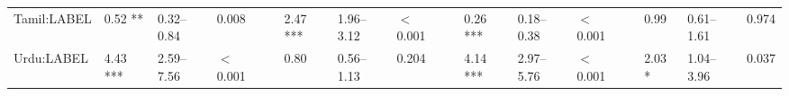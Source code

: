 \begin{table}[ht]
\begin{tabular}{}
Tamil:LABEL & 0.52 ** & 0.32--0.84 & 0.008 &  & 2.47 *** & 1.96--3.12 & $<$0.001 &  & 0.26 *** & 0.18--0.38 & $<$0.001 &  & 0.99 & 0.61--1.61 & 0.974 \\ 

Urdu:LABEL & 4.43 *** & 2.59--7.56 & $<$0.001 &  & 0.80 & 0.56--1.13 & 0.204 &  & 4.14 *** & 2.97--5.76 & $<$0.001 &  & 2.03 * & 1.04--3.96 & 0.037 \\ 



   \hline
\end{tabular}
\end{table}
